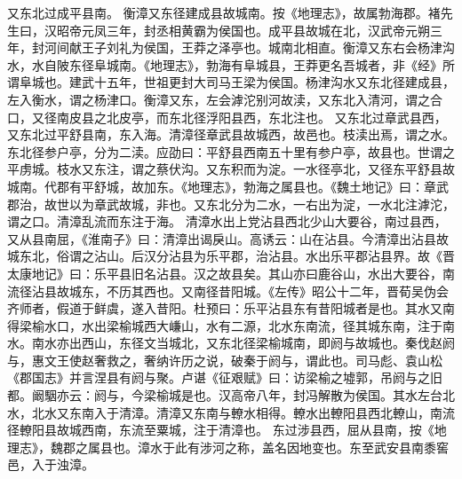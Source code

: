 \documentclass[12pt,UTF8]{ctexbook}
\begin{document}
又东北过成平县南。
衡漳又东径建成县故城南。按《地理志》，故属勃海郡。褚先生曰，汉昭帝元凤三年，封丞相黄霸为侯国也。成平县故城在北，汉武帝元朔三年，封河间献王子刘礼为侯国，王莽之泽亭也。城南北相直。衡漳又东右会杨津沟水，水自陂东径阜城南。《地理志》，勃海有阜城县，王莽更名吾城者，非《经》所谓阜城也。建武十五年，世祖更封大司马王梁为侯国。杨津沟水又东北径建成县，左入衡水，谓之杨津口。衡漳又东，左会滹沱别河故渎，又东北入清河，谓之合口，又径南皮县之北皮亭，而东北径浮阳县西，东北注也。
又东北过章武县西，又东北过平舒县南，东入海。清漳径章武县故城西，故邑也。枝渎出焉，谓之水。东北径参户亭，分为二渎。应劭曰：平舒县西南五十里有参户亭，故县也。世谓之平虏城。枝水又东注，谓之蔡伏沟。又东积而为淀。一水径亭北，又径东平舒县故城南。代郡有平舒城，故加东。《地理志》，勃海之属县也。《魏土地记》曰：章武郡治，故世以为章武故城，非也。又东北分为二水，一右出为淀，一水北注滹沱，谓之口。清漳乱流而东注于海。
清漳水出上党沾县西北少山大要谷，南过县西，又从县南屈，《淮南子》曰：清漳出谒戾山。高诱云：山在沾县。今清漳出沾县故城东北，俗谓之沾山。后汉分沾县为乐平郡，治沾县。水出乐平郡沾县界。故《晋太康地记》曰：乐平县旧名沾县。汉之故县矣。其山亦曰鹿谷山，水出大要谷，南流径沾县故城东，不历其西也。又南径昔阳城。《左传》昭公十二年，晋荀吴伪会齐师者，假道于鲜虞，遂入昔阳。杜预曰：乐平沾县东有昔阳城者是也。其水又南得梁榆水口，水出梁榆城西大嵰山，水有二源，北水东南流，径其城东南，注于南水。南水亦出西山，东径文当城北，又东北径梁榆城南，即阏与故城也。秦伐赵阏与，惠文王使赵奢救之，奢纳许历之说，破秦于阏与，谓此也。司马彪、袁山松《郡国志》并言涅县有阏与聚。卢谌《征艰赋》曰：访梁榆之墟郭，吊阏与之旧都。阚駰亦云：阏与，今梁榆城是也。汉高帝八年，封冯解散为侯国。其水左台北水，北水又东南入于清漳。清漳又东南与轑水相得。轑水出轑阳县西北轑山，南流径轑阳县故城西南，东流至粟城，注于清漳也。
东过涉县西，屈从县南，按《地理志》，魏郡之属县也。漳水于此有涉河之称，盖名因地变也。东至武安县南黍窖邑，入于浊漳。
\end{document}
